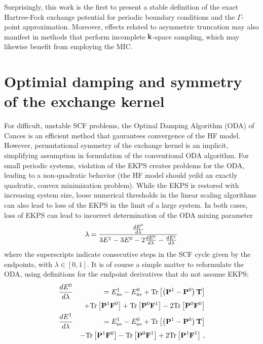 \documentclass[prb,aps,nobibnotes,twocolumn,doublespace,twocolumngrid,superbib]{revtex4}
\begin{document}
Surprisingly, this work is the first to present a stable definition of the exact Hartree-Fock 
exchange potential for periodic boundary conditions and the $\Gamma$-point approximation.  Moreover,
effects related to asymmetric truncation may also manifest in methods that perform incomplete 
${\bf k}$-space sampling, which  may likewise benefit from employing the MIC.

\section{Optimial damping and symmetry of the exchange kernel}

For difficult, unstable SCF problems, the Optinal Damping Algorithm (ODA) of Cances \cite{ECances00} is
an efficient method that gaurantees convergence of the HF model.  
However,  permutational symmetry of the exchange kernel is an implicit, simplifying assumption in formulation
of the conventional ODA algorithm.   For small periodic systems, violation of the EKPS creates problems
for the ODA, leading to a non-quadratic behavior (the HF model should yeild an exactly quadratic, convex 
minimization problem).   While the EKPS is restored with increasing system size, loose numerical thresholds
in the linear scaling algorithms can also lead to loss of the EKPS in the limit of a large system.  
In both cases, loss of EKPS can lead to incorrect determination of the ODA mixing parameter
%
\begin{eqnarray}
\lambda = {{\frac{d E^0}{d \lambda}} \over {3E^1-3E^0-2{\frac{d E^0}{d \lambda}}-{\frac{d E^1}{d \lambda}}}}
\end{eqnarray}
%
where the superscripts indicate consecutive steps in the SCF cycle given by the endpoints, 
with $\lambda \in [0,1]$.   It is of course a simple matter to reformulate the ODA, using definitions 
for the endpoint derivatives that do not assume EKPS:
\begin{eqnarray}
\frac{d E^0}{d \lambda} &&=  E^{1}_{\rm ne}-E^{0}_{\rm ne}  
+{\rm Tr}\left[\left( {\bf P}^1 - {\bf P}^0 \right) {\bf T}  \right]\nonumber\\
&& +{\rm Tr}\left[ {\bf P}^1 {\bf F}^0 \right] 
   +{\rm Tr}\left[ {\bf P}^0 {\bf F}^1 \right] 
   -2 {\rm Tr}\left[ {\bf P}^0 {\bf F}^0 \right] \nonumber\\
\frac{d E^1}{d \lambda} &&=  E^{1}_{\rm ne}-E^{0}_{\rm ne}  
+{\rm Tr}\left[\left( {\bf P}^1 - {\bf P}^0 \right) {\bf T}  \right]\nonumber\\
&& -{\rm Tr}\left[ {\bf P}^1 {\bf F}^0 \right] 
   -{\rm Tr}\left[ {\bf P}^0 {\bf F}^1 \right] 
   +2 {\rm Tr}\left[ {\bf P}^1 {\bf F}^1 \right] \, , \nonumber\\
\end{eqnarray}
\end{document}
